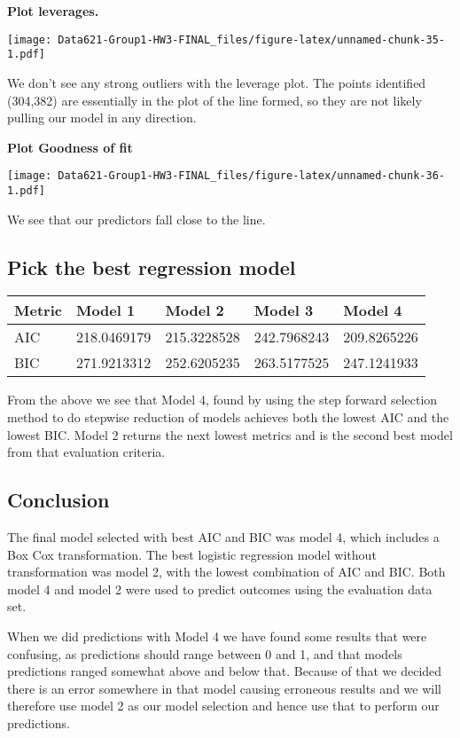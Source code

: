 \documentclass[
]{article}
\begin{document}
\textbf{Plot leverages.}

\texttt{[image: Data621-Group1-HW3-FINAL\_files/figure-latex/unnamed-chunk-35-1.pdf]}

We don't see any strong outliers with the leverage plot. The points
identified (304,382) are essentially in the plot of the line formed, so
they are not likely pulling our model in any direction.

\textbf{Plot Goodness of fit}

\texttt{[image: Data621-Group1-HW3-FINAL\_files/figure-latex/unnamed-chunk-36-1.pdf]}

We see that our predictors fall close to the line.

\hypertarget{pick-the-best-regression-model}{%
\subsection{Pick the best regression
model}\label{pick-the-best-regression-model}}

\begin{longtable}[]{@{}lllll@{}}
\toprule
Metric & Model 1 & Model 2 & Model 3 & Model 4\tabularnewline
\midrule
\endhead
AIC & 218.0469179 & 215.3228528 & 242.7968243 &
209.8265226\tabularnewline
BIC & 271.9213312 & 252.6205235 & 263.5177525 &
247.1241933\tabularnewline
\bottomrule
\end{longtable}

From the above we see that Model 4, found by using the step forward
selection method to do stepwise reduction of models achieves both the
lowest AIC and the lowest BIC. Model 2 returns the next lowest metrics
and is the second best model from that evaluation criteria.

\hypertarget{conclusion}{%
\subsection{Conclusion}\label{conclusion}}

The final model selected with best AIC and BIC was model 4, which
includes a Box Cox transformation. The best logistic regression model
without transformation was model 2, with the lowest combination of AIC
and BIC. Both model 4 and model 2 were used to predict outcomes using
the evaluation data set.

When we did predictions with Model 4 we have found some results that
were confusing, as predictions should range between 0 and 1, and that
models predictions ranged somewhat above and below that. Because of that
we decided there is an error somewhere in that model causing erroneous
results and we will therefore use model 2 as our model selection and
hence use that to perform our predictions.
\end{document}

